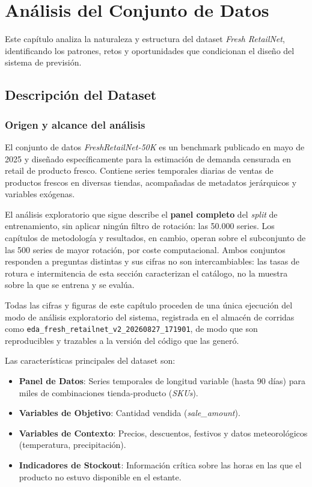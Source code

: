 \chapter{Análisis del Conjunto de Datos}
\label{chap:analisis_datos}

Este capítulo analiza la naturaleza y estructura del dataset \textit{Fresh RetailNet}, identificando los patrones, retos y oportunidades que condicionan el diseño del sistema de previsión.

\section{Descripción del Dataset}

\subsection{Origen y alcance del análisis}

El conjunto de datos \textit{FreshRetailNet-50K} \cite{freshretailnet2025} es un benchmark
publicado en mayo de 2025 y diseñado específicamente para la estimación de demanda censurada en
retail de producto fresco. Contiene series temporales diarias de ventas de productos frescos en diversas tiendas, acompañadas de metadatos jerárquicos y variables exógenas.

El análisis exploratorio que sigue describe el \textbf{panel completo} del
\textit{split} de entrenamiento, sin aplicar ningún filtro de rotación: las 50.000 series. Los
capítulos de metodología y resultados, en cambio, operan sobre el subconjunto de las 500 series de
mayor rotación, por coste computacional. Ambos conjuntos responden a preguntas distintas y sus
cifras no son intercambiables: las tasas de rotura e intermitencia de esta sección caracterizan el
catálogo, no la muestra sobre la que se entrena y se evalúa.

Todas las cifras y figuras de este capítulo proceden de una única ejecución del modo de análisis
exploratorio del sistema, registrada en el almacén de corridas como
\texttt{eda\_fresh\_}\allowbreak\texttt{retailnet\_v2\_}\allowbreak\texttt{20260827\_171901}, de modo que son reproducibles y
trazables a la versión del código que las generó.

Las características principales del dataset son:
\begin{itemize}
    \item \textbf{Panel de Datos}: Series temporales de longitud variable (hasta 90 días) para miles de combinaciones tienda-producto (\textit{SKUs}).
    \item \textbf{Variables de Objetivo}: Cantidad vendida (\textit{sale\_amount}).
    \item \textbf{Variables de Contexto}: Precios, descuentos, festivos y datos meteorológicos (temperatura, precipitación).
    \item \textbf{Indicadores de Stockout}: Información crítica sobre las horas en las que el producto no estuvo disponible en el estante.
\end{itemize}

